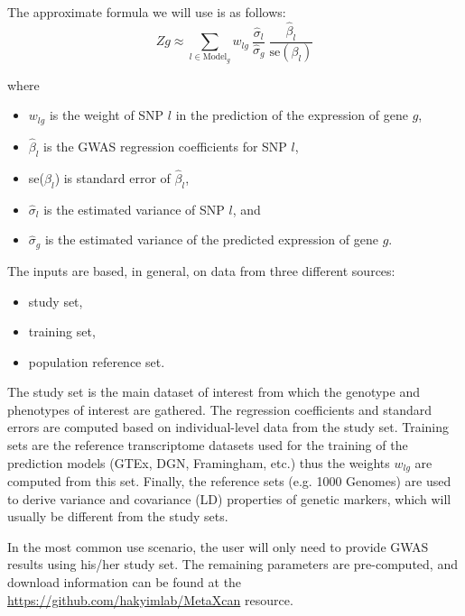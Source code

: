 \documentclass[10pt]{article}
\begin{document}
The approximate formula we will use is as follows:
\begin{equation}
Zg \approx \sum_{l\in \text{Model}_g} w_{lg} ~\frac{\hat\sigma_l}{\hat\sigma_g} ~  \frac{\hat\beta_l}{\text{se}(\beta_l)} 
\end{equation}

where

\begin{itemize}
\item $w_{lg}$ is the weight of SNP $l$ in the prediction of the expression of gene $g$,
\item $\hat\beta_l$ is the GWAS regression coefficients for SNP $l$,
\item se($\beta_l$) is standard error of $\hat\beta_l$,
\item $\hat\sigma_l$ is the estimated variance of SNP $l$, and
\item $\hat\sigma_g$ is the estimated variance of the predicted expression of gene $g$.
\end{itemize}

The inputs are based, in general, on data from three different sources: 
\begin{itemize}
\item study set,
\item training set,
\item population reference set. 
\end{itemize}

The study set is the main dataset of interest from which the genotype and phenotypes of interest are gathered. 
The regression coefficients and standard errors are computed based on individual-level data from the study set. Training sets are the reference transcriptome datasets used for the training of the prediction models (GTEx, DGN, Framingham, etc.) thus the weights $w_{lg}$ are computed from this set. Finally, the reference sets (e.g. 1000 Genomes) are used to derive variance and covariance (LD) properties of genetic markers, which will usually be different from the study sets.

In the most common use scenario, the user will only need to provide GWAS results using his/her study set. The remaining parameters are pre-computed, and download information can be found at the \url{https://github.com/hakyimlab/MetaXcan} resource.
\end{document}
